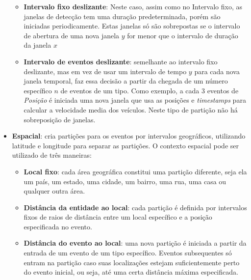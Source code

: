 \begin{itemize}
\begin{itemize}
\item \textbf{Intervalo fixo deslizante}: 
Neste caso, assim como no Intervalo fixo, as janelas de detecção tem uma duração predeterminada, porém são iniciadas periodicamente. Estas janelas só são sobrepostas se o intervalo de abertura de uma nova janela $y$ for menor que o intervalo de duração da janela $x$
\item \textbf{Intervalo de eventos deslizante}: semelhante ao intervalo fixo deslizante, mas em vez de usar um intervalo de tempo $y$ para cada nova janela temporal, faz essa decisão a partir da chegada de um número específico $n$ de eventos de um tipo. Como exemplo, a cada 3 eventos de \emph{Posição} é iniciada uma nova janela que usa as posições e \textit{timestamps} para calcular a velocidade media dos veículos. Neste tipo de partição não há sobreposição de janelas. %
\end{itemize}
\item \textbf{Espacial}: cria partições para os eventos por intervalos geográficos, utilizando latitude e longitude para separar as partições. O contexto espacial pode ser utilizado de três maneiras:
\begin{itemize}
\item \textbf{Local fixo}: cada área geográfica constitui uma partição diferente, seja ela um país, um estado, uma cidade, um bairro, uma rua, uma casa ou qualquer outra área.
\item \textbf{Distância da entidade ao local}: cada partição é definida por intervalos fixos de raios de distância entre um local específico e a posição especificada no evento.
\item \textbf{Distância do evento ao local}: uma nova partição é iniciada a partir da entrada de um evento de um tipo específico. Eventos subsequentes só entram na partição caso suas localizações estejam suficientemente perto do evento inicial, ou seja, até uma certa distância máxima especificada.

\end{itemize}
\end{itemize}
